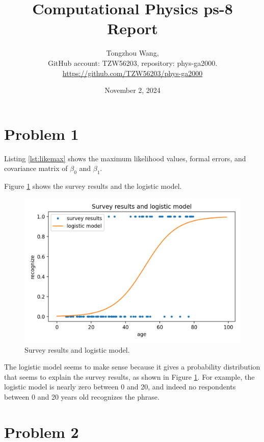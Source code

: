 \documentclass[11pt]{article}
\title{Computational Physics ps-8 Report}
\author{Tongzhou Wang, \\ GitHub account: TZW56203, repository: phys-ga2000. \\ \url{https://github.com/TZW56203/phys-ga2000}}
\date{November 2, 2024}
\begin{document}
\maketitle

\section{Problem 1}
Listing \ref{lst:likemax} shows the maximum likelihood values, formal errors, and covariance matrix of $\beta_0$ and $\beta_1$.


Figure \ref{fig:SandL} shows the survey results and the logistic model.
\begin{figure}[H]
    \centering
    \includegraphics[scale = 0.8]{images/ps-8-1.png}
    \caption{Survey results and logistic model.}
    \label{fig:SandL}
\end{figure}

The logistic model seems to make sense because it gives a probability distribution that seems to explain the survey results, as shown in Figure \ref{fig:SandL}. For example, the logistic model is nearly zero between 0 and 20, and indeed no respondents between 0 and 20 years old recognizes the phrase.

\section{Problem 2}
\end{document}
